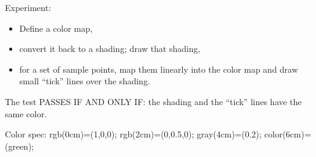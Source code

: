 {
Experiment:
\begin{itemize}
	\item Define a color map,
	\item convert it back to a shading; draw that shading,
	\item for a set of sample points, map them linearly into the color map and draw small ``tick'' lines over the shading.
\end{itemize}

The test PASSES IF AND ONLY IF: the shading and the ``tick'' lines have the same color.

Color spec: {rgb(0cm)=(1,0,0); rgb(2cm)=(0,0.5,0);  gray(4cm)=(0.2);  color(6cm)=(green); }


\def\LENGTH{300}

\pgfplotscolormaptoshadingspec{my map}{\LENGTH pt}\temp
\def\tempb{\pgfdeclarehorizontalshading{myshadingA}{1cm}}
\expandafter\tempb\expandafter{\temp}


}
